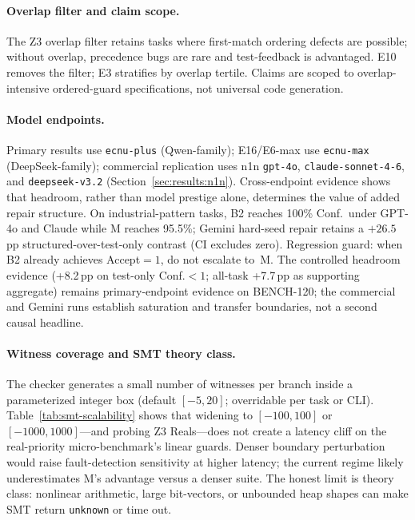 \paragraph{Overlap filter and claim scope.}
The Z3 overlap filter retains tasks where first-match ordering defects are
possible; without overlap, precedence bugs are rare and test-feedback is
advantaged.
E10 removes the filter; E3 stratifies by overlap tertile.
Claims are scoped to overlap-intensive ordered-guard specifications, not
universal code generation.

\paragraph{Model endpoints.}
Primary results use \texttt{ecnu-plus} (Qwen-family); E16/E6-max use
\texttt{ecnu-max} (DeepSeek-family); commercial replication uses n1n
\texttt{gpt-4o}, \texttt{claude-sonnet-4-6}, and \texttt{deepseek-v3.2}
(Section~\ref{sec:results:n1n}).
Cross-endpoint evidence shows that headroom, rather than model prestige alone,
determines the value of added repair structure.
On industrial-pattern tasks, B2 reaches 100\% Conf.\ under GPT-4o and Claude
while M reaches 95.5\%; Gemini hard-seed repair retains a ${+}26.5$\,pp
structured-over-test-only contrast (CI excludes zero).
Regression guard: when B2 already achieves Accept${=}1$, do not escalate to~M.
The controlled headroom evidence (+8.2\,pp on test-only Conf.${<}1$; all-task
+7.7\,pp as supporting aggregate) remains primary-endpoint evidence on
BENCH-120; the commercial and Gemini runs establish saturation and transfer
boundaries, not a second causal headline.

\paragraph{Witness coverage and SMT theory class.}
The checker generates a small number of witnesses per branch inside a
parameterized integer box (default $[-5,20]$; overridable per task or CLI).
Table~\ref{tab:smt-scalability} shows that widening to $[-100,100]$ or
$[-1000,1000]$---and probing Z3 Reals---does not create a latency cliff on
the real-priority micro-benchmark's linear guards.
Denser boundary perturbation would raise fault-detection sensitivity at higher
latency; the current regime likely underestimates M's advantage versus a denser
suite.
The honest limit is theory class: nonlinear arithmetic, large bit-vectors, or
unbounded heap shapes can make SMT return \texttt{unknown} or time out.

